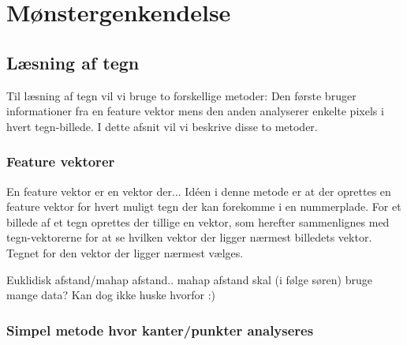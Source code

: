 \section{Mønstergenkendelse}
\label{sec_monster}

\begin{comment}
Noter fra møde med Søren 20/2:
Opret feature vektor $f$ for hvert bogstav $\omega$
Finde middelværdivektor for hvert $\omega$.
Afstandsfunktion: den afstand til en middelværdivektor der er mindst, vælges. Dvs. det bogstav vælges.
Featurevektorafstand udregnes hver gang

Euklidisk afstand
En-eller-anden mahap afstand
\end{comment}

\subsection{Læsning af tegn}

Til læsning af tegn vil vi bruge to forskellige metoder: Den første bruger informationer fra en feature vektor mens den anden analyserer enkelte pixels i hvert tegn-billede. I dette afsnit vil vi beskrive disse to metoder.

\subsubsection{Feature vektorer}
En feature vektor er en vektor der... Idéen i denne metode er at der oprettes en feature vektor for hvert muligt tegn der kan forekomme i en nummerplade. For et billede af et tegn oprettes der tillige en vektor, som herefter sammenlignes med tegn-vektorerne for at se hvilken vektor der ligger nærmest billedets vektor. Tegnet for den vektor der ligger nærmest vælges.

Euklidisk afstand/mahap afstand.. mahap afstand skal (i følge søren) bruge mange data? Kan dog ikke huske hvorfor :)

\subsubsection{Simpel metode hvor kanter/punkter analyseres}